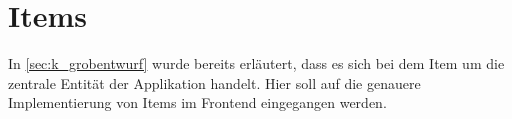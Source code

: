 \section{Items}
\label{sec:f_items}

In \cref{sec:k_grobentwurf} wurde bereits erläutert, dass es sich bei dem Item
um die zentrale Entität der Applikation handelt.  Hier soll auf die genauere
Implementierung von Items im Frontend eingegangen werden.




